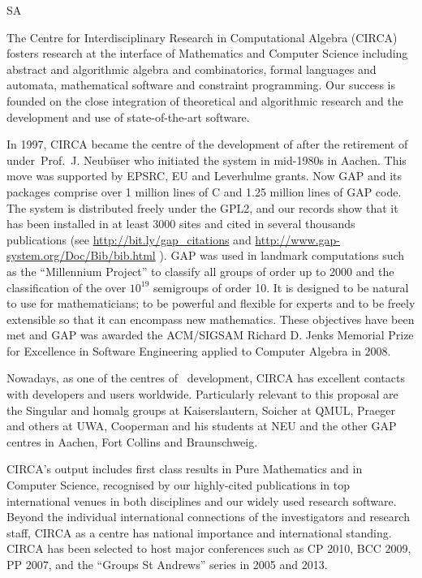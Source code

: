 \begin{sitedescription}{SA}

% 


The Centre for Interdisciplinary Research in Computational Algebra (CIRCA)
fosters research at the interface of Mathematics and Computer Science including
abstract and algorithmic algebra and combinatorics, formal languages and
automata, mathematical software and constraint programming. Our success is 
founded on the close integration of theoretical and algorithmic research and 
the development and use of state-of-the-art software.

In 1997, CIRCA became the centre of the development of \GAP after the 
retirement of under~Prof.~J. Neub\"user who initiated the system in 
mid-1980s in Aachen. This move was supported by EPSRC, EU and Leverhulme 
grants. Now GAP and its packages comprise over 1 million lines of C and 
1.25 million lines of GAP code. The system is distributed freely under the GPL2,
and our records show that it has been installed in at least 3000 sites and 
cited in several thousands publications 
(see \url{http://bit.ly/gap_citations} and \url{http://www.gap-system.org/Doc/Bib/bib.html} ). 
GAP was used in landmark computations such as the ``Millennium Project'' 
to classify all groups of order up to 2000 
and the classification of the over $10^{19}$ semigroups of order 10. It is 
designed to be natural to use for mathematicians; to be powerful and flexible 
for experts and to be freely extensible so that it can encompass new mathematics. 
These objectives have been met and GAP was awarded the ACM/SIGSAM Richard D. Jenks
Memorial Prize for Excellence in Software Engineering applied to Computer Algebra in 2008.

Nowadays, as one of the centres of \GAP\ development, CIRCA has
excellent contacts with developers and users worldwide. Particularly 
relevant to this proposal are the Singular and homalg groups at 
Kaiserslautern, Soicher at QMUL, Praeger and others at UWA, Cooperman 
and his students at NEU and the other GAP centres in Aachen, Fort Collins 
and Braunschweig.

CIRCA's output includes first class results in Pure Mathematics and in
Computer Science, recognised by our highly-cited publications in top
international venues in both disciplines and our widely used research
software. Beyond the individual international connections of the 
investigators and research staff, CIRCA as a centre has national 
importance and international standing. CIRCA has been selected to host 
major conferences such as CP 2010, BCC 2009, PP 2007, and the 
``Groups St Andrews'' series in 2005 and 2013.



\end{sitedescription}
